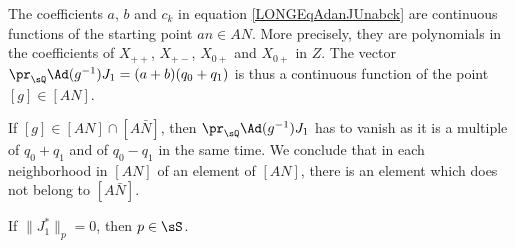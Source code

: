 \begin{remark}        \label{LONGRemANANbarYapas}
	The coefficients $a$, $b$ and $c_k$ in equation \eqref{LONGEqAdanJUnabck} are continuous functions of the starting point $an\in AN$. More precisely, they are polynomials in the coefficients of $X_{++}$, $X_{+-}$, $X_{0+}$ and $X_{0+}$ in $Z$. The vector $\pr_{\sQ}\Ad(g^{-1})J_1=(a+b)(q_0+q_1)$ is thus a continuous function of the point $[g]\in[AN]$.

	If $[g]\in[AN]\cap[A\bar N]$, then $\pr_{\sQ}\Ad(g^{-1})J_1$ has to vanish as it is a multiple of $q_0+q_1$ and of $q_0-q_1$ in the same time. We conclude that in each neighborhood in $[AN]$ of an element of $[AN]$, there is an element which does not belong to $[A\bar N]$.
\end{remark}

\begin{proposition}
	If $\| J_1^* \|_p=0$, then $p\in\sS$.
\end{proposition}

